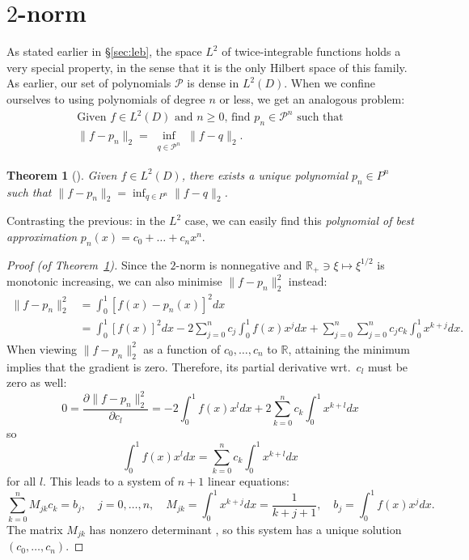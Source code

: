 \documentclass[11pt]{report}
\newtheorem{theorem}{Theorem}
\theoremstyle{definition}
\theoremstyle{remark}
\newcommand{\R}{\mathbb{R}}
\renewcommand{\P}{\mathcal{P}}
\begin{document}
\section{$2$-norm}
As stated earlier in \S\ref{sec:leb}, the space $L^2$ of twice-integrable functions holds a very special property, in the sense that it is the only Hilbert space of this family.  As earlier, our set of polynomials $\P$ is dense in $L^2(D)$. When we confine ourselves to using polynomials of degree $n$ or less, we get an analogous problem:
\begin{gather}
  \text{Given $f \in L^2(D)$ and $n \geq 0$, find $p_n \in \P^n$ such that} \nonumber\\
  \|f - p_n\|_2 = \inf_{\substack{q \in \P^n}}\|f - q\|_2.
  \label{approx2norm}
\end{gather}
\begin{theorem}[{\cite[Thm.~9.2]{NA}}]
  \label{thm:2norm}
  Given $f \in L^2(D)$, there exists a unique polynomial $p_n \in P^n$ such that $\|f - p_n\|_2 = \inf_{q \in P^n} \|f - q\|_2$.
\end{theorem}

Contrasting the previous: in the $L^2$ case, we can easily find this \emph{polynomial of best approximation} $p_n(x) = c_0 + \ldots + c_nx^n$.

\begin{proof}[Proof (of Theorem~\ref{thm:2norm})]
Since the $2$-norm is nonnegative and $\R_+ \ni \xi \mapsto \xi^{1/2}$ is monotonic increasing, we can also minimise $\|f - p_n\|_2^2$ instead:
\begin{align}
  \label{proof2normmin}
  \|f - p_n\|^2_2 &= \int_0^1[f(x) - p_n(x)]^2 dx \nonumber \\
  &= \int_0^1 [f(x)]^2 dx - 2\sum_{j=0}^n c_j \int_0^1 f(x) x^j dx + \sum_{j=0}^n\sum_{j=0}^n c_j c_k \int_0^1 x^{k+j} dx.
\end{align}
When viewing $\|f - p_n\|_2^2$ as a function of $c_0, \ldots, c_n$ to $\R$, attaining the minimum implies that the gradient is zero. Therefore, its partial derivative wrt.~$c_l$ must be zero as well:
\[
  0 = \frac{\partial \|f - p_n\|_2^2}{\partial c_l} = - 2 \int_0^1 f(x) x^l dx + 2 \sum_{k=0}^n c_k \int_0^1 x^{k+l} dx
\]
so
\begin{equation}
  \label{proof2normc}
  \int_0^1 f(x) x^l dx = \sum_{k=0}^n c_k \int_0^1 x^{k+l} dx
\end{equation}
for all $l$. This leads to a system of $n+1$ linear equations:
\[
  \sum_{k=0}^n M_{jk} c_k = b_j, \quad j = 0, \ldots, n, \quad M_{jk} = \int_0^1 x^{k+j} dx = \frac{1}{k+j+1}, \quad b_j = \int_0^1 f(x) x^j dx.
\]
The matrix $M_{jk}$ has nonzero determinant \cite{choi}, so this system has a unique solution $(c_0, \ldots, c_n)$.
\end{proof}
\end{document}
